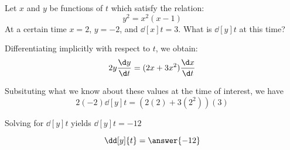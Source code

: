 \documentclass{ximera}
\author{Steven Gubkin}
\begin{document}
\begin{exercise}



Let $x$ and $y$ be functions of $t$ which satisfy the relation:
\[
y^2 = x^2(x-1)
\]
At a certain time $x = 2$, $y=-2$, and $\dd[x]{t} = 3$.  What is
$\dd[y]{t}$ at this time?

\begin{hint}
  Differentiating implicitly with respect to $t$, we obtain:
\[
2y\frac{\d y}{\d t} = (2x+3x^2)\frac{\d x}{\d t}
\]
\end{hint}

\begin{hint}
  Subsituting what we know about these values at the time of interest, we have
\[
2(-2) \dd[y]{t} = (2(2)+3(2^2))(3)
\]
\end{hint}

\begin{hint}
  Solving for $\dd[y]{t}$ yields $\dd[y]{t} = -12$
\end{hint}

\begin{prompt}
  \[
  \dd[y]{t} = \answer{-12}
  \]
\end{prompt}
\end{exercise}
\end{document}
